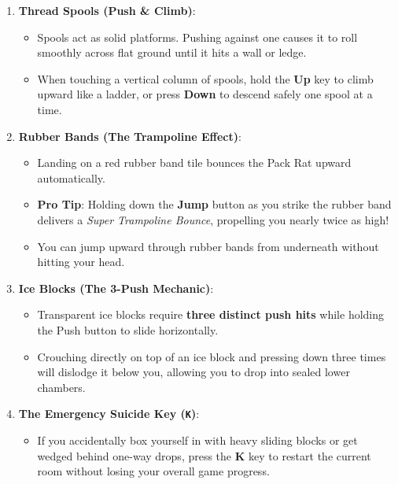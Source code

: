 \documentclass[10pt,letterpaper]{article}
\begin{document}
\begin{enumerate}[leftmargin=1.5em,itemsep=2pt]
    \item \textbf{Thread Spools (Push \& Climb)}:
    \begin{itemize}[noitemsep]
        \item Spools act as solid platforms. Pushing against one causes it to roll smoothly across flat ground until it hits a wall or ledge.
        \item When touching a vertical column of spools, hold the \textbf{Up} key to climb upward like a ladder, or press \textbf{Down} to descend safely one spool at a time.
    \end{itemize}

    \item \textbf{Rubber Bands (The Trampoline Effect)}:
    \begin{itemize}[noitemsep]
        \item Landing on a red rubber band tile bounces the Pack Rat upward automatically.
        \item \textbf{Pro Tip}: Holding down the \textbf{Jump} button as you strike the rubber band delivers a \emph{Super Trampoline Bounce}, propelling you nearly twice as high!
        \item You can jump upward through rubber bands from underneath without hitting your head.
    \end{itemize}

    \item \textbf{Ice Blocks (The 3-Push Mechanic)}:
    \begin{itemize}[noitemsep]
        \item Transparent ice blocks require \textbf{three distinct push hits} while holding the Push button to slide horizontally.
        \item Crouching directly on top of an ice block and pressing down three times will dislodge it below you, allowing you to drop into sealed lower chambers.
    \end{itemize}

    \item \textbf{The Emergency Suicide Key (\texttt{K})}:
    \begin{itemize}[noitemsep]
        \item If you accidentally box yourself in with heavy sliding blocks or get wedged behind one-way drops, press the \textbf{K} key to restart the current room without losing your overall game progress.
    \end{itemize}


\end{enumerate}
\end{document}
